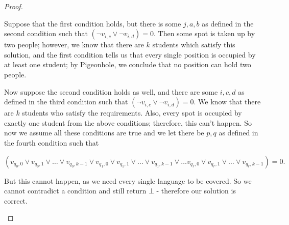\documentclass[11pt]{article}
\begin{document}
\begin{enumerate}
\begin{proof}
\begin{enumerate}
Suppose that the first condition holds, but there is some $j, a, b$ as defined in the second condition such that $(\neg v_{i, c} \vee \neg v_{i, d}) = 0$. Then some spot is taken up by two people; however, we know that there are $k$ students which satisfy this solution, and the first condition tells us that every single position is occupied by at least one student; by Pigeonhole, we conclude that no position can hold two people.

Now suppose the second condition holds as well, and there are some $i, c, d$ as defined in the third condition such that $(\neg v_{i, c} \vee \neg v_{i, d}) = 0$. We know that there are $k$ students who satisfy the requirements. Also, every spot is occupied by exactly one student from the above conditions; therefore, this can't happen. So now we assume all these conditions are true and we let there be $p, q$ as defined in the fourth condition such that  

$$
(v_{q_0, 0} \vee v_{q_0, 1} \vee \dots \vee v_{q_0, k - 1} \vee v_{q_1, 0} \vee v_{q_1, 1} \vee \dots \vee v_{q_1, k - 1} \vee \dots v_{q_r, 0} \vee v_{q_r, 1}\vee \dots \vee v_{q_r, k - 1}) = 0.
$$

But this cannot happen, as we need every single language to be covered. So we cannot contradict a condition and still return $\bot$ - therefore our solution is correct.


\end{enumerate}
\end{proof}
 
\end{enumerate}
\end{document}
